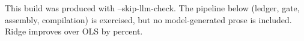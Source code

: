 This build was produced with --skip-llm-check. The pipeline below (ledger, gate, assembly, compilation) is exercised, but no model-generated prose is included. Ridge improves over OLS by  percent.
